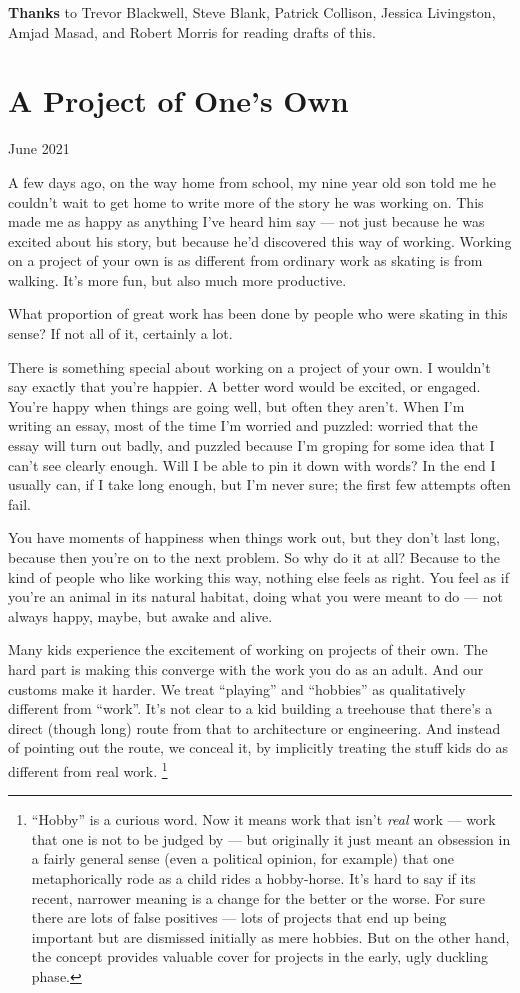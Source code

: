 \documentclass[12pt]{book}
\begin{document}
\textbf{Thanks} to Trevor Blackwell, Steve Blank, Patrick Collison,
Jessica Livingston, Amjad Masad, and Robert Morris for reading drafts of
this.
\chapter{A Project of One's Own}

June 2021

A few days ago, on the way home from school, my nine year old son told
me he couldn't wait to get home to write more of the story he was
working on. This made me as happy as anything I've heard him say --- not
just because he was excited about his story, but because he'd discovered
this way of working. Working on a project of your own is as different
from ordinary work as skating is from walking. It's more fun, but also
much more productive.

What proportion of great work has been done by people who were skating
in this sense? If not all of it, certainly a lot.

There is something special about working on a project of your own. I
wouldn't say exactly that you're happier. A better word would be
excited, or engaged. You're happy when things are going well, but often
they aren't. When I'm writing an essay, most of the time I'm worried and
puzzled: worried that the essay will turn out badly, and puzzled because
I'm groping for some idea that I can't see clearly enough. Will I be
able to pin it down with words? In the end I usually can, if I take long
enough, but I'm never sure; the first few attempts often fail.

You have moments of happiness when things work out, but they don't last
long, because then you're on to the next problem. So why do it at all?
Because to the kind of people who like working this way, nothing else
feels as right. You feel as if you're an animal in its natural habitat,
doing what you were meant to do --- not always happy, maybe, but awake
and alive.

Many kids experience the excitement of working on projects of their own.
The hard part is making this converge with the work you do as an adult.
And our customs make it harder. We treat ``playing'' and ``hobbies'' as
qualitatively different from ``work''. It's not clear to a kid building
a treehouse that there's a direct (though long) route from that to
architecture or engineering. And instead of pointing out the route, we
conceal it, by implicitly treating the stuff kids do as different from
real work. \footnote{``Hobby'' is a curious word. Now it means work that isn't
\emph{real} work --- work that one is not to be judged by --- but
originally it just meant an obsession in a fairly general sense (even a
political opinion, for example) that one metaphorically rode as a child
rides a hobby-horse. It's hard to say if its recent, narrower meaning is
a change for the better or the worse. For sure there are lots of false
positives --- lots of projects that end up being important but are
dismissed initially as mere hobbies. But on the other hand, the concept
provides valuable cover for projects in the early, ugly duckling phase.}
\end{document}
